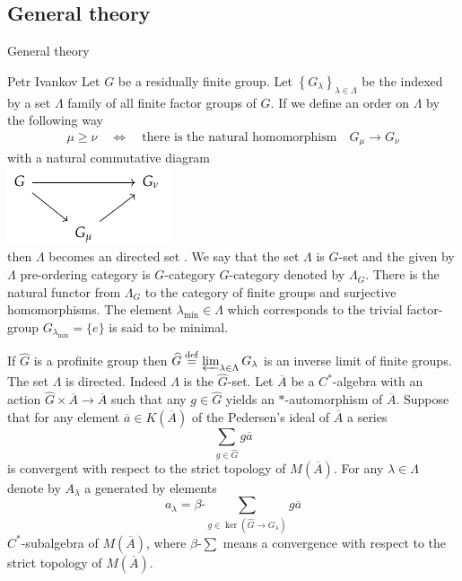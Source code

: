 \documentclass{beamer}
\theoremstyle{plain}
\newcommand{\be}{\begin{equation}}
\newcommand{\ee}{\end{equation}}
\newcommand{\la}{\lambda}
\newcommand{\La}{\Lambda}
\newcommand{\bt}{\beta}           %
\newcommand{\bean}{\begin{eqnarray*}}
\newcommand{\eean}{\end{eqnarray*}}
\newcommand{\bydef}{\stackrel{\mathrm{def}}{=}}
\begin{document}
\subsection{General theory}
\begin{frame}
	\begin{center}
	\huge General theory \normalsize \\
	\end{center}
	

 \begin{definition}\label{g_category_defn}\alert{Petr Ivankov}
	Let $ G$ be a residually finite group. 
	Let $\left\{G_\la\right\}_{\la\in \La}$ be the indexed by a set $\La$ family of all finite factor groups of $ G$. If we define an order on $\La$ by the following way
	\bean\label{top_group_order_eqn}
	\mu \ge \nu \quad \Leftrightarrow \quad \text{there is the natural homomorphism} \quad G_\mu \to G_\nu
	\eean
	with a natural commutative diagram
	\\
	\includegraphics[scale=0.8]{g.png}
	\\
	then $\La$ becomes an directed set . We say that the set $\La$ is $  G$-\alert{set} and the given by $\La$ pre-ordering category  is $  G$-\alert{category}  $  G$-{category} denoted by $\La_{ G }$.
	There is the natural functor from $\La_{ G }$ to the category of finite groups and surjective homomorphisms. The element $\la_{\min }\in \La$ which corresponds to the trivial factor-group $G_{\la_{\min}}= \{e\}$ is said to be \alert{minimal}.
\end{definition}
\end{frame}
\begin{frame}
 	If  $\widehat{G}$ is a profinite group   then 
$\widehat{G} \bydef \varprojlim_{\la \in \La}  G_\la$ is an inverse limit of finite groups. The set $\La$ is directed. Indeed $\La$ is the $\widehat{G}$-set. Let $\overline A$ be a $C^*$-algebra with an action $\widehat{G}\times \overline A\to \overline A$ such that any $ g \in \widehat G$ yields an $*$-automorphism of $\overline A$.	  
Suppose that for any element $\overline a \in K\left(\overline A \right)$ of the Pedersen's ideal of $\overline A$  a series 
\be\label{infinite_covering_basic_eqn}
\sum_{	g \in \widehat{G}}g \overline a
\ee
is convergent with respect to the strict topology of $M\left(\overline A\right)$.  For any $\la \in \La$ denote by $A_\la$ a generated by elements
\be\label{basic_cov_cl_eqn}
a_\la =\bt\text{-} \sum_{	g \in \ker\left( \widehat{G}\to G_\la\right) }g \overline a
\ee
$C^*$-subalgebra of $M\left(\overline A\right)$, where  $\bt\text{-} \sum$ means a convergence  with respect to the strict topology of $M\left(\overline A\right)$. 
\end{frame}
\end{document}
